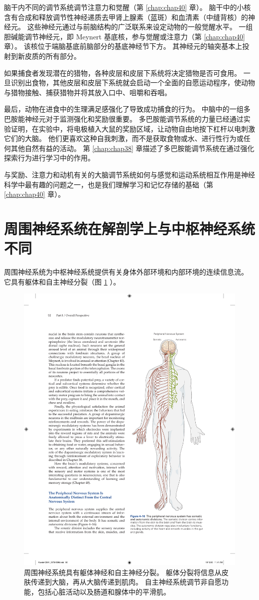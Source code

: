 脑干内不同的调节系统调节注意力和觉醒（第 \ref{chap:chap40} 章）。 
脑干中的小核含有合成和释放调节性神经递质去甲肾上腺素（蓝斑）和血清素（中缝背核）的神经元。 
这些神经元通过与前脑结构的广泛联系来设定动物的一般觉醒水平。 
一组胆碱能调节神经元，即 Meynert 基底核，参与觉醒或注意力（第 \ref{chap:chap40} 章）。 
该核位于端脑基底前脑部分的基底神经节下方。 
其神经元的轴突基本上投射到新皮质的所有部分。


如果捕食者发现潜在的猎物，各种皮层和皮层下系统将决定猎物是否可食用。 
一旦识别出食物，其他皮层和皮层下系统就会启动一个全面的自愿运动程序，使动物与猎物接触、捕获猎物并将其放入口中、咀嚼和吞咽。


最后，动物在进食中的生理满足感强化了导致成功捕食的行为。 
中脑中的一组多巴胺能神经元对于监测强化和奖励很重要。 
多巴胺能调节系统的力量已经通过实验证明，在实验中，将电极植入大鼠的奖励区域，让动物自由地按下杠杆以电刺激它们的大脑。 
他们更喜欢这种自我刺激，而不是获取食物或水、进行性行为或任何其他自然有益的活动。 
第 \ref{chap:chap38} 章描述了多巴胺能调节系统在通过强化探索行为进行学习中的作用。


与奖励、注意力和动机有关的大脑调节系统如何与感觉和运动系统相互作用是神经科学中最有趣的问题之一，也是我们理解学习和记忆存储的基础（第 \ref{chap:chap40} 章）。


\section{周围神经系统在解剖学上与中枢神经系统不同}
周围神经系统为中枢神经系统提供有关身体外部环境和内部环境的连续信息流。 
它具有躯体和自主神经分裂（图 \ref{fig:4_16} ）。

\begin{figure}[htbp]
	\centering
	\includegraphics[width=0.5\linewidth]{chap04/fig_4_16}
	\caption{周围神经系统具有躯体神经和自主神经分裂。 
		躯体分裂将信息从皮肤传递到大脑，再从大脑传递到肌肉。 
		自主神经系统调节非自愿功能，包括心脏活动以及肠道和腺体中的平滑肌。}
	\label{fig:4_16}
\end{figure}


